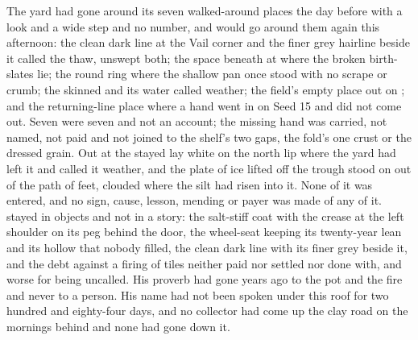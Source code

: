 The yard had gone around its seven walked-around places the day before with a look and a wide step and no number, and would go around them again this afternoon: the clean dark line at the Vail corner and the finer grey hairline beside it called the thaw, unswept both; the space beneath  at  where the broken birth-slates lie; the round ring where the shallow pan once stood with no scrape or crumb; the skinned  and its water called weather; the field's empty place out on ; and the returning-line place where a hand went in on Seed 15 and did not come out. Seven were seven and not an account; the missing hand was carried, not named, not paid and not joined to the shelf's two gaps, the fold's one crust or the dressed grain. Out at  the stayed  lay white on the north lip where the yard had left it and called it weather, and the plate of ice lifted off the trough stood on  out of the path of feet, clouded where the silt had risen into it. None of it was entered, and no sign, cause, lesson, mending or payer was made of any of it.  stayed in objects and not in a story: the salt-stiff coat with the crease at the left shoulder on its peg behind the door, the wheel-seat keeping its twenty-year lean and its hollow that nobody filled, the clean dark line with its finer grey beside it, and the debt against a firing of tiles neither paid nor settled nor done with, and worse for being uncalled. His proverb had gone years ago to the pot and the fire and never to a person. His name had not been spoken under this roof for two hundred and eighty-four days, and no collector had come up the clay road on the mornings behind and none had gone down it.

